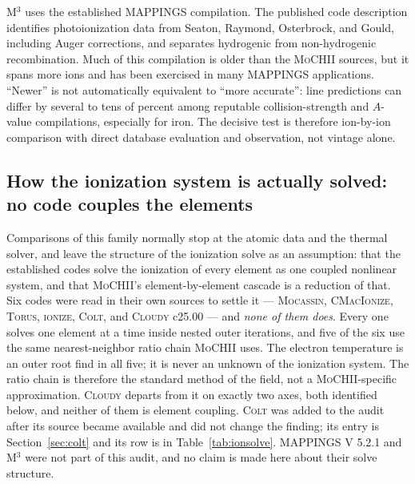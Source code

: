 \documentclass[english,a4paper]{my_memo}
\newcommand{\MoCHII}{\textsc{MoCHII}}
\newcommand{\Mthree}{M$^3$}
\newcommand{\Mappings}{MAPPINGS V 5.2.1}
\newcommand{\Wood}{\textsc{ionize}}
\newcommand{\CMI}{\textsc{CMacIonize}}
\newcommand{\Torus}{\textsc{Torus}}
\newcommand{\Mocassin}{\textsc{Mocassin}}
\newcommand{\Cloudy}{\textsc{Cloudy}}
\newcommand{\Colt}{\textsc{Colt}}
\begin{document}
\Mthree{} uses the established MAPPINGS compilation.  The published code
description identifies photoionization data from Seaton, Raymond,
Osterbrock, and Gould, including Auger corrections, and separates hydrogenic from
non-hydrogenic recombination.  Much of this compilation is older than the
\MoCHII{} sources, but it spans more ions and has been exercised in many
MAPPINGS applications.  ``Newer'' is not automatically equivalent to
``more accurate'': line predictions can differ by several to tens of
percent among reputable collision-strength and $A$-value compilations,
especially for iron.  The decisive test is therefore ion-by-ion
comparison with direct database evaluation and observation, not vintage
alone.

\subsection{How the ionization system is actually solved: no code couples
the elements}
\label{sec:ionsolve}

Comparisons of this family normally stop at the atomic data and the thermal
solver, and leave the structure of the ionization solve as an assumption:
that the established codes solve the ionization of every element as one
coupled nonlinear system, and that \MoCHII{}'s element-by-element cascade is
a reduction of that.  Six codes were read in their own sources to settle it
--- \Mocassin{}, \CMI{}, \Torus{}, \Wood{}, \Colt{}, and \Cloudy{} c25.00
--- and \emph{none of them does}.  Every one solves one element at a time
inside nested outer iterations, and five of the six use the same
nearest-neighbor ratio chain \MoCHII{} uses.  The electron temperature is an outer root find
in all five; it is never an unknown of the ionization system.  The ratio
chain is therefore the standard method of the field, not a
\MoCHII{}-specific approximation.  \Cloudy{} departs from it on exactly two
axes, both identified below, and neither of them is element coupling.
\Colt{} was added to the audit after its source became available and did not
change the finding; its entry is Section~\ref{sec:colt} and its row is in
Table~\ref{tab:ionsolve}.
\Mappings{} and \Mthree{} were not part of this audit, and no claim is made
here about their solve structure.
\end{document}
